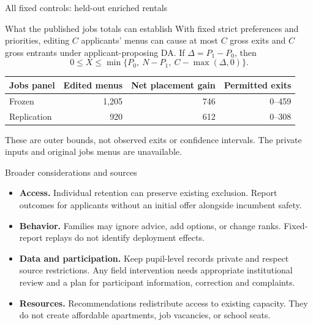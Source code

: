 \begin{frame}{All fixed controls: held-out enriched rentals}
\small
\begin{center}

\end{center}
\end{frame}

\begin{frame}{What the published jobs totals can establish}
\small
With fixed strict preferences and priorities, editing $C$ applicants' menus
can cause at most $C$ gross exits and $C$ gross entrants under applicant-proposing DA.
If $\Delta=P_1-P_0$, then
\[
0\le X\le\min\{P_0,\ N-P_1,\ C-\max(\Delta,0)\}.
\]
\begin{center}
\begin{tabular}{lrrr}\toprule
Jobs panel & Edited menus & Net placement gain & Permitted exits\\\midrule
Frozen & 1,205 & 746 & 0--459\\
Replication & 920 & 612 & 0--308\\\bottomrule
\end{tabular}
\end{center}
These are outer bounds, not observed exits or confidence intervals.
The private inputs and original jobs menus are unavailable.
\end{frame}

\begin{frame}{Broader considerations and sources}
\small
\begin{itemize}
\item \textbf{Access.} Individual retention can preserve existing exclusion.
Report outcomes for applicants without an initial offer alongside incumbent safety.
\item \textbf{Behavior.} Families may ignore advice, add options, or change ranks.
Fixed-report replays do not identify deployment effects.
\item \textbf{Data and participation.} Keep pupil-level records private and respect
source restrictions. Any field intervention needs appropriate institutional review
and a plan for participant information, correction and complaints.
\item \textbf{Resources.} Recommendations redistribute access to existing capacity.
They do not create affordable apartments, job vacancies, or school seats.
\end{itemize}
\end{frame}
